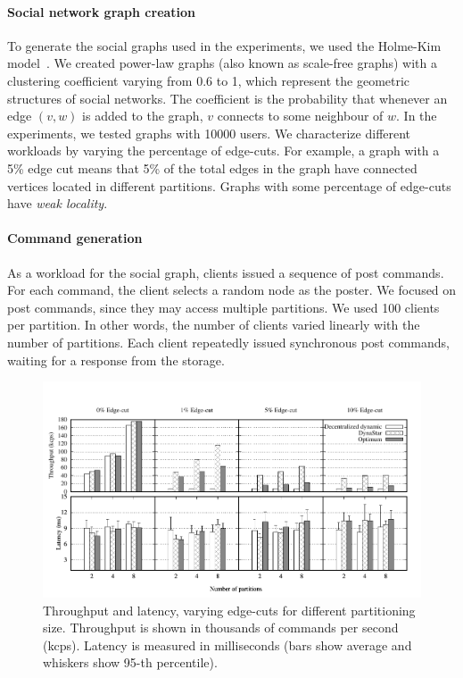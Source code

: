 \paragraph*{Social network graph creation}
%
To generate the social graphs used in the experiments, we used the
Holme-Kim model~\cite{holme-kim}. We created power-law graphs (also
known as scale-free graphs) with a clustering coefficient varying from
0.6 to 1, which represent the geometric structures of social
networks. The coefficient is the probability that whenever an edge
$(v, w)$ is added to the graph, $v$ connects to some neighbour of $w$.
In the experiments, we tested graphs with 10000 users. We characterize
different workloads by varying the percentage of edge-cuts.  For
example, a graph with a 5\% edge cut means that 5\% of the total edges
in the graph have connected vertices located in different partitions.
Graphs with some percentage of edge-cuts have \emph{weak locality}.

\paragraph*{Command generation}
%
As a workload for the social graph, clients issued a sequence of post
commands.  For each command, the client selects a random node as
the poster.  We focused on post commands, since they may access
multiple partitions.  We used 100 clients per partition. In other
words, the number of clients varied linearly with the number of
partitions.  Each client repeatedly issued synchronous post commands,
waiting for a response from the storage.

\begin{figure}[ht!]
	\includegraphics{figures/socc/socc-throughput-latency-avg-all}
	\caption{Throughput and latency, varying edge-cuts for different partitioning size. 
  Throughput is shown in thousands of commands per second (kcps). 
  Latency is measured in milliseconds (bars show average and whiskers show 95-th percentile).}
	\label{fig:varying_edge_cut}
\end{figure}



